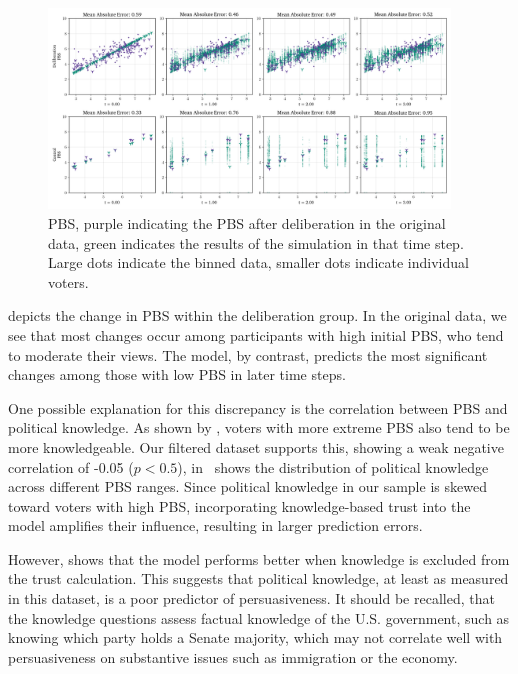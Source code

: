 \begin{figure}[ht]
	\begin{center}
		\includegraphics[width=0.95\textwidth]{Figures/pbs_scores.png}
	\end{center}
	\caption{ PBS, purple indicating the PBS after deliberation in the original data, green indicates the results of the simulation in that time step. Large dots indicate the binned data, smaller dots indicate individual voters.}\label{fig:pbs}
\end{figure}

 depicts the change in PBS within the deliberation
group. In the original data, we see that most changes occur among participants
with high initial PBS, who tend to moderate their views. The model, by
contrast, predicts the most significant changes among those with low PBS in
later time steps.

One possible explanation for this discrepancy is the correlation between PBS
and political knowledge. As shown by \citet{fishkinCanDeliberationHave2024},
voters with more extreme PBS also tend to be more knowledgeable. Our
filtered dataset supports this, showing a weak negative correlation of -0.05
($p < 0.5$),  in~
shows the distribution of political knowledge across different PBS ranges.
Since political knowledge in our sample is skewed toward voters with high PBS,
incorporating knowledge-based trust into the model amplifies their influence,
resulting in larger prediction errors.

However,  shows that the model performs better when
knowledge is excluded from the trust calculation. This suggests that political
knowledge, at least as measured in this dataset, is a poor predictor of
persuasiveness. It should be recalled, that the knowledge questions assess factual
knowledge of the U.S. government, such as knowing which party holds a
Senate majority, which may not correlate well with persuasiveness on substantive
issues such as immigration or the economy.


